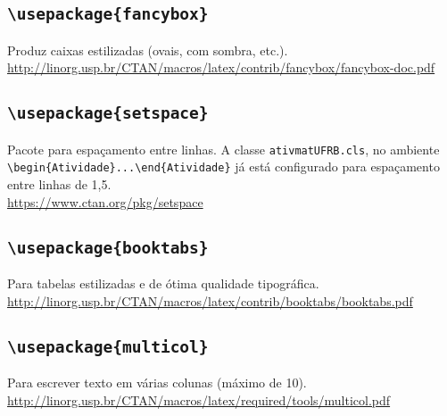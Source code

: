 \subsection*{\texttt{\textbackslash usepackage\{fancybox\}}}
Produz caixas estilizadas (ovais, com sombra, etc.).\\
{\small\url{http://linorg.usp.br/CTAN/macros/latex/contrib/fancybox/fancybox-doc.pdf}}

\subsection*{\texttt{\textbackslash usepackage\{setspace\}}}
Pacote para espaçamento entre linhas.
A classe \texttt{ativmatUFRB.cls}, no ambiente 
\verb|\begin{Atividade}...\end{Atividade}| já está configurado para espaçamento
entre linhas de 1,5. \\
{\small\url{https://www.ctan.org/pkg/setspace}}

\subsection*{\texttt{\textbackslash usepackage\{booktabs\}}}
Para tabelas estilizadas e de ótima qualidade tipográfica.\\ 
{\small\url{http://linorg.usp.br/CTAN/macros/latex/contrib/booktabs/booktabs.pdf}}

\subsection*{\texttt{\textbackslash usepackage\{multicol\}}}
Para escrever texto em várias colunas (máximo de 10).\\
{\small\url{http://linorg.usp.br/CTAN/macros/latex/required/tools/multicol.pdf}}

